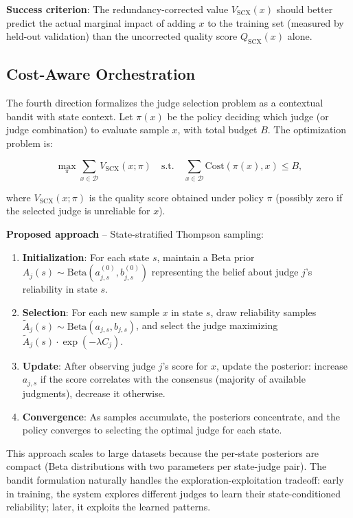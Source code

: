 \documentclass[11pt,twocolumn]{article}
\begin{document}
\textbf{Success criterion}: The redundancy-corrected value $V_{\text{SCX}}(x)$ should better predict the actual marginal impact of adding $x$ to the training set (measured by held-out validation) than the uncorrected quality score $Q_{\text{SCX}}(x)$ alone.

\subsection{Cost-Aware Orchestration}
\label{sec:orchestration}

The fourth direction formalizes the judge selection problem as a contextual bandit with state context. Let $\pi(x)$ be the policy deciding which judge (or judge combination) to evaluate sample $x$, with total budget $B$. The optimization problem is:

\begin{equation}
\max_{\pi} \sum_{x \in \mathcal{D}} V_{\text{SCX}}(x; \pi) \quad \text{s.t.} \quad \sum_{x \in \mathcal{D}} \text{Cost}(\pi(x), x) \leq B,
\label{eq:bandit_objective}
\end{equation}

where $V_{\text{SCX}}(x; \pi)$ is the quality score obtained under policy $\pi$ (possibly zero if the selected judge is unreliable for $x$).

\textbf{Proposed approach} -- State-stratified Thompson sampling:
\begin{enumerate}
    \item \textbf{Initialization}: For each state $s$, maintain a Beta prior $A_j(s) \sim \text{Beta}(a_{j,s}^{(0)}, b_{j,s}^{(0)})$ representing the belief about judge $j$'s reliability in state $s$.
    \item \textbf{Selection}: For each new sample $x$ in state $s$, draw reliability samples $\tilde{A}_j(s) \sim \text{Beta}(a_{j,s}, b_{j,s})$, and select the judge maximizing $\tilde{A}_j(s) \cdot \exp(-\lambda C_j)$.
    \item \textbf{Update}: After observing judge $j$'s score for $x$, update the posterior: increase $a_{j,s}$ if the score correlates with the consensus (majority of available judgments), decrease it otherwise.
    \item \textbf{Convergence}: As samples accumulate, the posteriors concentrate, and the policy converges to selecting the optimal judge for each state.
\end{enumerate}

This approach scales to large datasets because the per-state posteriors are compact (Beta distributions with two parameters per state-judge pair). The bandit formulation naturally handles the exploration-exploitation tradeoff: early in training, the system explores different judges to learn their state-conditioned reliability; later, it exploits the learned patterns.
\end{document}
